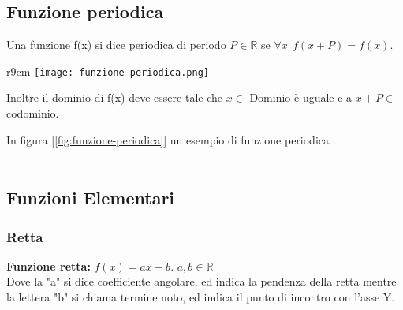 \subsection{Funzione periodica}
\begin{definition}[Periodicità]
    Una funzione f(x) si dice periodica di periodo $P \in \mathbb{R}$ se $\forall x \: \: f(x + P) = f(x)$. 
\end{definition}
\begin{wrapfigure}{r}{9cm}
    \vspace{-15pt}
    \centering
    \texttt{[image: funzione-periodica.png]}
    \caption{$sin(x) = sin(x + 2\pi)$}
    \label{fig:funzione-periodica}
\end{wrapfigure}
Inoltre il dominio di f(x) deve essere tale che $x \in$ Dominio è uguale e a $x + P \in$ codominio.
\begin{example}
In figura [\ref{fig:funzione-periodica}] un esempio di funzione periodica.\\\\
\end{example}

\newpage
\subsection{Funzioni Elementari}
\subsubsection{Retta}
\textbf{Funzione retta:} $f(x) = ax + b$. \hspace{.3cm} $a,b \in \mathbb{R}$ \\ Dove la "a" si dice coefficiente angolare, ed indica la pendenza della retta mentre la lettera "b" si chiama termine noto, ed indica il punto di incontro con l'asse Y.

